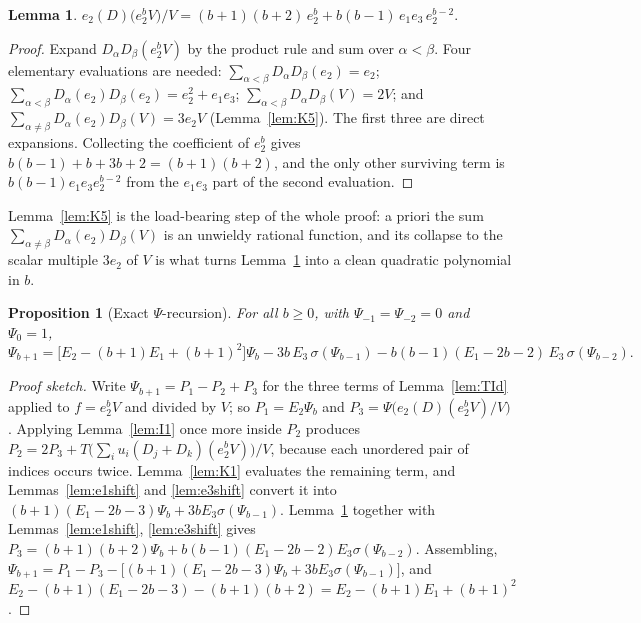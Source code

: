 \documentclass[10pt]{article}
\theoremstyle{plain}
\newtheorem{proposition}[theorem]{Proposition}
\newtheorem{lemma}[theorem]{Lemma}
\theoremstyle{definition}
\begin{document}
\begin{lemma}\label{lem:Ab}
$\displaystyle e_2(D)\big(e_2^bV\big)\big/V=(b+1)(b+2)\,e_2^b+b(b-1)\,e_1e_3\,e_2^{b-2}.$
\end{lemma}

\begin{proof}
Expand $D_\alpha D_\beta(e_2^bV)$ by the product rule and sum over $\alpha<\beta$. Four
elementary evaluations are needed:
$\sum_{\alpha<\beta}D_\alpha D_\beta(e_2)=e_2$;
$\sum_{\alpha<\beta}D_\alpha(e_2)D_\beta(e_2)=e_2^2+e_1e_3$;
$\sum_{\alpha<\beta}D_\alpha D_\beta(V)=2V$;
and $\sum_{\alpha\ne\beta}D_\alpha(e_2)D_\beta(V)=3e_2V$ (Lemma~\ref{lem:K5}). The first
three are direct expansions. Collecting the coefficient of $e_2^b$ gives
$b(b-1)+b+3b+2=(b+1)(b+2)$, and the only other surviving term is $b(b-1)e_1e_3e_2^{b-2}$
from the $e_1e_3$ part of the second evaluation.
\end{proof}

Lemma~\ref{lem:K5} is the load-bearing step of the whole proof: a priori the sum
$\sum_{\alpha\ne\beta}D_\alpha(e_2)D_\beta(V)$ is an unwieldy rational function, and its
collapse to the scalar multiple $3e_2$ of $V$ is what turns Lemma~\ref{lem:Ab} into a clean
quadratic polynomial in $b$.

\begin{proposition}[Exact $\Psi$-recursion]\label{prop:fullrec}
For all $b\ge0$, with $\Psi_{-1}=\Psi_{-2}=0$ and $\Psi_0=1$,
\begin{equation}\label{eq:fullrec}
 \Psi_{b+1}=\big[E_2-(b+1)E_1+(b+1)^2\big]\Psi_b
   -3b\,E_3\,\sigma(\Psi_{b-1})
   -b(b-1)(E_1-2b-2)\,E_3\,\sigma(\Psi_{b-2}).
\end{equation}
\end{proposition}

\begin{proof}[Proof sketch]
Write $\Psi_{b+1}=P_1-P_2+P_3$ for the three terms of Lemma~\ref{lem:TId} applied to
$f=e_2^bV$ and divided by $V$; so $P_1=E_2\Psi_b$ and $P_3=\Psi\big(e_2(D)(e_2^bV)/V\big)$.
Applying Lemma~\ref{lem:I1} once more inside $P_2$ produces $P_2=2P_3+
T\big(\sum_iu_i(D_j+D_k)(e_2^bV)\big)/V$, because each unordered pair of indices occurs
twice. Lemma~\ref{lem:K1} evaluates the remaining term, and Lemmas~\ref{lem:e1shift} and
\ref{lem:e3shift} convert it into
$(b+1)(E_1-2b-3)\Psi_b+3bE_3\sigma(\Psi_{b-1})$. Lemma~\ref{lem:Ab} together with
Lemmas~\ref{lem:e1shift}, \ref{lem:e3shift} gives
$P_3=(b+1)(b+2)\Psi_b+b(b-1)(E_1-2b-2)E_3\sigma(\Psi_{b-2})$. Assembling,
$\Psi_{b+1}=P_1-P_3-\big[(b+1)(E_1-2b-3)\Psi_b+3bE_3\sigma(\Psi_{b-1})\big]$, and
$E_2-(b+1)(E_1-2b-3)-(b+1)(b+2)=E_2-(b+1)E_1+(b+1)^2$.
\end{proof}
\end{document}
